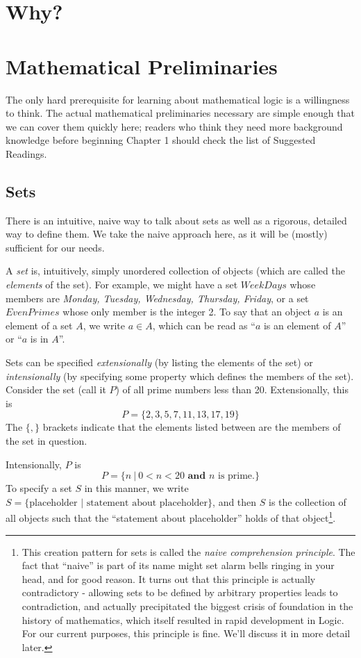 \documentclass[12pt]{article}
\begin{document}
\section{Why?}

\section{Mathematical Preliminaries}
The only hard prerequisite for learning about mathematical logic is a willingness to think. The actual mathematical preliminaries necessary are simple enough that we can cover them quickly here; readers who think they need more background knowledge before beginning Chapter 1 should check the list of Suggested Readings. 

\subsection{Sets}
There is an intuitive, naive way to talk about sets as well as a rigorous, detailed way to define them. We take the naive approach here, as it will be (mostly) sufficient for our needs. 

A \emph{set} is, intuitively, simply unordered collection of objects (which are called the \emph{elements} of the set). For example, we might have a set $WeekDays$ whose members are \emph{Monday, Tuesday, Wednesday, Thursday, Friday}, or a set $EvenPrimes$ whose only member is the integer 2. To say that an object $a$ is an element of a set $A$, we write $a \in A$, which can be read as ``$a$ is an element of $A$'' or ``$a$ is in $A$''. 

Sets can be specified \emph{extensionally} (by listing the elements of the set) or \emph{intensionally} (by specifying some property which defines the members of the set). Consider the set (call it $P$) of all prime numbers less than 20. Extensionally, this is
\[
  P = \{2, 3, 5, 7, 11, 13, 17, 19\}
\]
The $\{,\}$ brackets indicate that the elements listed between are the members of the set in question. 

Intensionally, $P$ is
\[
  P = \{n\ |\ 0 < n < 20 \textbf{ and } n \text{ is prime.}\}
\]
To specify a set $S$ in this manner, we write $S = \{\text{placeholder }| \text{ statement about placeholder}\}$, and then $S$ is the collection of all objects such that the ``statement about placeholder'' holds of that object\footnote{This creation pattern for sets is called the \emph{naive comprehension principle}. The fact that ``naive'' is part of its name might set alarm bells ringing in your head, and for good reason. It turns out that this principle is actually contradictory - allowing sets to be defined by arbitrary properties leads to contradiction, and actually precipitated the biggest crisis of foundation in the history of mathematics, which itself resulted in rapid development in Logic. For our current purposes, this principle is fine. We'll discuss it in more detail later.}. 
\end{document}

